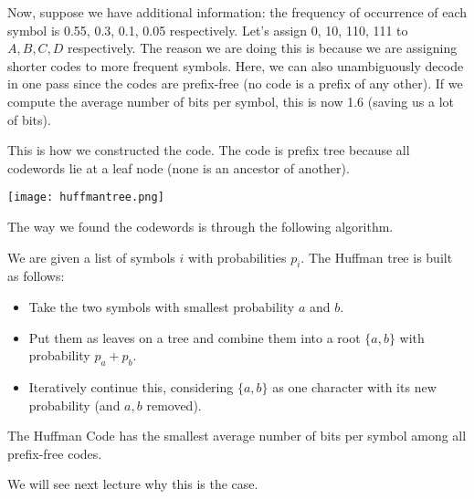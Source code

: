 Now, suppose we have additional information: the frequency of occurrence of each symbol is
0.55, 0.3, 0.1, 0.05 respectively. Let's assign 0, 10, 110, 111 to $A, B, C, D$ respectively.
The reason we are doing this is because we are assigning shorter codes to more frequent symbols.
Here, we can also unambiguously decode in one pass since the codes are prefix-free (no code is a prefix of
any other). If we compute the average number of bits per symbol, this is now 1.6 (saving us a lot of bits).

This is how we constructed the code. The code is prefix tree because all codewords lie at a leaf node (none is an ancestor of another).

\texttt{[image: huffmantree.png]}

The way we found the codewords is through the following algorithm.

\begin{note}
    We are given a list of symbols $i$ with probabilities $p_i$. The Huffman tree is built as follows:
    \begin{itemize}
        \item Take the two symbols with smallest probability $a$ and $b$.
        \item Put them as leaves on a tree and combine them into a root $\{a, b\}$ with probability $p_a + p_b$.
        \item Iteratively continue this, considering $\{a, b\}$ as one character with its new probability (and $a, b$ removed).
    \end{itemize}
\end{note}

\begin{theorem}
    The Huffman Code has the smallest average number of bits per symbol among all prefix-free codes.
\end{theorem}

We will see next lecture why this is the case.